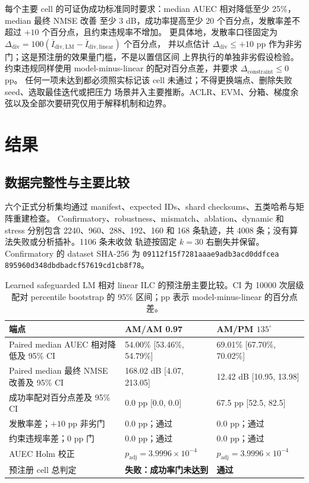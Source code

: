 \documentclass[UTF8,zihao=-4,a4paper]{ctexart}
\begin{document}
每个主要 cell 的可证伪成功标准同时要求：median AUEC 相对降低至少 25\%，median 最终 NMSE 改善
至少 3 dB，成功率提高至少 20 个百分点，发散率差不超过 $+10$ 个百分点，且约束违规率不增加。
更具体地，发散率口径固定为
$\Delta_{\mathrm{div}}=100(\overline I_{\mathrm{div,LM}}-\overline I_{\mathrm{div,linear}})$ 个百分点，
并以点估计 $\Delta_{\mathrm{div}}\leq+10$ pp 作为非劣门；这是预注册的效果量门槛，不是以置信区间
上界执行的单独非劣假设检验。约束违规同样使用 model-minus-linear 的配对百分点差，并要求
$\Delta_{\mathrm{constraint}}\leq0$ pp。
任何一项未达到都必须照实标记该 cell 未通过；不得更换端点、删除失败 seed、选取最佳迭代或把压力
场景并入主要推断。ACLR、EVM、分箱、梯度余弦以及全部次要研究仅用于解释机制和边界。

\section{结果}
\label{sec:results}

\subsection{数据完整性与主要比较}

六个正式分析集均通过 manifest、expected IDs、shard checksums、五类哈希与矩阵重建检查。
Confirmatory、robustness、mismatch、ablation、dynamic 和 stress 分别包含
2240、960、288、192、160 和 168 条轨迹，共 4008 条；没有算法失败或分析插补。1106 条未收敛
轨迹按固定 $k=30$ 右删失并保留。Confirmatory 的 dataset SHA-256 为
\texttt{09112f15f7281aaa\allowbreak e9adb3acd0ddfcea\allowbreak
895960d348dbdbad\allowbreak cf57619cd1cb8f78}。

\begin{table}[t]
  \centering
  \caption{Learned safeguarded LM 相对 linear ILC 的预注册主要比较。CI 为 10000 次层级配对
  percentile bootstrap 的 95\% 区间；pp 表示 model-minus-linear 的百分点差。}
  \label{tab:primary-results}
  \begin{tabularx}{\linewidth}{lYY}
    \toprule
    端点 & AM/AM 0.97 & AM/PM $135^\circ$ \\
    \midrule
    Paired median AUEC 相对降低及 95\% CI
      & 54.00\% [53.46\%, 54.79\%]
      & 69.01\% [67.70\%, 70.02\%] \\
    Paired median 最终 NMSE 改善及 95\% CI
      & 168.02 dB [4.07, 213.05]
      & 12.42 dB [10.95, 13.98] \\
    成功率配对百分点差及 95\% CI
      & 0.0 pp [0.0, 0.0]
      & 67.5 pp [52.5, 82.5] \\
    发散率差；$+10$ pp 非劣门
      & 0.0 pp；通过
      & 0.0 pp；通过 \\
    约束违规率差；$0$ pp 门
      & 0.0 pp；通过
      & 0.0 pp；通过 \\
    AUEC Holm 校正
      & $p_{\mathrm{adj}}=3.9996\times10^{-4}$
      & $p_{\mathrm{adj}}=3.9996\times10^{-4}$ \\
    预注册 cell 总判定
      & \textbf{失败：成功率门未达到}
      & \textbf{通过} \\
    \bottomrule
  \end{tabularx}
\end{table}
\end{document}
